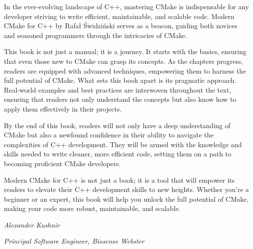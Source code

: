 In the ever-evolving landscape of C++, mastering CMake is indispensable for any developer striving to write efficient, maintainable, and scalable code. Modern CMake for C++ by Rafał Świdziński serves as a beacon, guiding both novices and seasoned programmers through the intricacies of CMake.

This book is not just a manual; it is a journey. It starts with the basics, ensuring that even those new to CMake can grasp its concepts. As the chapters progress, readers are equipped with advanced techniques, empowering them to harness the full potential of CMake.
What sets this book apart is its pragmatic approach. Real-world examples and best practices are interwoven throughout the text, ensuring that readers not only understand the concepts but also know how to apply them effectively in their projects.

By the end of this book, readers will not only have a deep understanding of CMake but also a newfound confidence in their ability to navigate the complexities of C++ development. They will be armed with the knowledge and skills needed to write cleaner, more efficient code, setting them on a path to becoming proficient CMake developers.

Modern CMake for C++ is not just a book; it is a tool that will empower its readers to elevate their C++ development skills to new heights. Whether you’re a beginner or an expert, this book will help you unlock the full potential of CMake, making your code more robust, maintainable, and scalable.

\begin{center}
\textit{Alexander Kushnir}

\textit{Principal Software Engineer, Biosense Webster}
\end{center}

